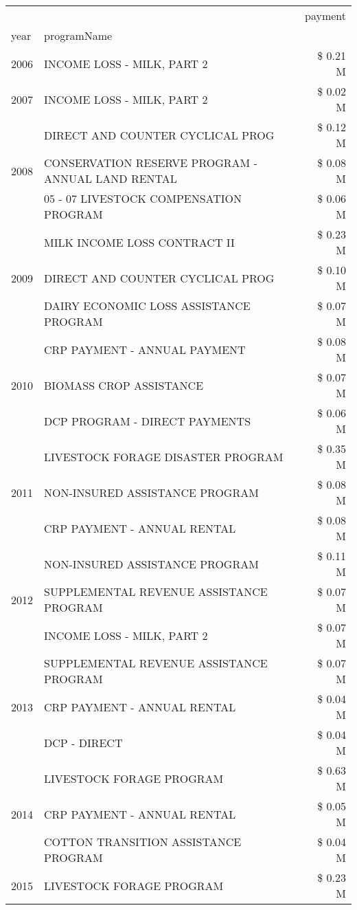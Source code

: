 \begin{tabular}{llr}
\toprule
 &  & payment \\
year & programName &  \\
\midrule
2006 & INCOME LOSS - MILK, PART 2 & \$ 0.21 M \\
\cline{1-3}
2007 & INCOME LOSS - MILK, PART 2 & \$ 0.02 M \\
\cline{1-3}
\multirow[t]{3}{*}{2008} & DIRECT AND COUNTER CYCLICAL PROG & \$ 0.12 M \\
 & CONSERVATION RESERVE PROGRAM - ANNUAL LAND RENTAL & \$ 0.08 M \\
 & 05 - 07 LIVESTOCK COMPENSATION PROGRAM & \$ 0.06 M \\
\cline{1-3}
\multirow[t]{3}{*}{2009} & MILK INCOME LOSS CONTRACT II & \$ 0.23 M \\
 & DIRECT AND COUNTER CYCLICAL PROG & \$ 0.10 M \\
 & DAIRY ECONOMIC LOSS ASSISTANCE PROGRAM & \$ 0.07 M \\
\cline{1-3}
\multirow[t]{3}{*}{2010} & CRP PAYMENT - ANNUAL PAYMENT & \$ 0.08 M \\
 & BIOMASS CROP ASSISTANCE & \$ 0.07 M \\
 & DCP PROGRAM - DIRECT PAYMENTS & \$ 0.06 M \\
\cline{1-3}
\multirow[t]{3}{*}{2011} & LIVESTOCK FORAGE DISASTER PROGRAM & \$ 0.35 M \\
 & NON-INSURED ASSISTANCE PROGRAM & \$ 0.08 M \\
 & CRP PAYMENT - ANNUAL RENTAL & \$ 0.08 M \\
\cline{1-3}
\multirow[t]{3}{*}{2012} & NON-INSURED ASSISTANCE PROGRAM & \$ 0.11 M \\
 & SUPPLEMENTAL REVENUE ASSISTANCE PROGRAM & \$ 0.07 M \\
 & INCOME LOSS - MILK, PART 2 & \$ 0.07 M \\
\cline{1-3}
\multirow[t]{3}{*}{2013} & SUPPLEMENTAL REVENUE ASSISTANCE PROGRAM & \$ 0.07 M \\
 & CRP PAYMENT - ANNUAL RENTAL & \$ 0.04 M \\
 & DCP - DIRECT & \$ 0.04 M \\
\cline{1-3}
\multirow[t]{3}{*}{2014} & LIVESTOCK FORAGE PROGRAM & \$ 0.63 M \\
 & CRP PAYMENT - ANNUAL RENTAL & \$ 0.05 M \\
 & COTTON TRANSITION ASSISTANCE PROGRAM & \$ 0.04 M \\
\cline{1-3}
\multirow[t]{3}{*}{2015} & LIVESTOCK FORAGE PROGRAM & \$ 0.23 M \\

\end{tabular}
